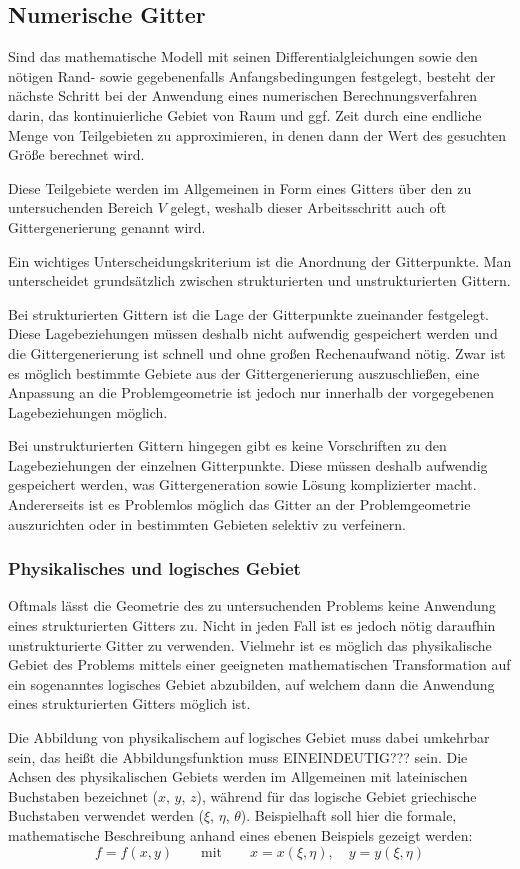\subsection{Numerische Gitter}

Sind das mathematische Modell mit seinen Differentialgleichungen sowie den nötigen
Rand- sowie gegebenenfalls Anfangsbedingungen festgelegt, besteht der nächste Schritt
bei der Anwendung eines numerischen Berechnungsverfahren darin, das kontinuierliche
Gebiet von Raum und ggf. Zeit durch eine endliche Menge von Teilgebieten zu approximieren,
in denen dann der Wert des gesuchten Größe berechnet wird.

Diese Teilgebiete werden im Allgemeinen in Form eines Gitters über den zu untersuchenden
Bereich $V$ gelegt, weshalb dieser Arbeitsschritt auch oft Gittergenerierung genannt wird.

Ein wichtiges Unterscheidungskriterium ist die Anordnung der Gitterpunkte.
Man unterscheidet grundsätzlich zwischen strukturierten und unstrukturierten Gittern.

Bei strukturierten Gittern ist die Lage der Gitterpunkte zueinander festgelegt. Diese
Lagebeziehungen müssen deshalb nicht aufwendig gespeichert werden und die Gittergenerierung
ist schnell und ohne großen Rechenaufwand nötig. Zwar ist es möglich bestimmte Gebiete
aus der Gittergenerierung auszuschließen, eine Anpassung an die Problemgeometrie ist
jedoch nur innerhalb der vorgegebenen Lagebeziehungen möglich.

Bei unstrukturierten Gittern hingegen gibt es keine Vorschriften zu den Lagebeziehungen
der einzelnen Gitterpunkte. Diese müssen deshalb aufwendig gespeichert werden, was
Gittergeneration sowie Lösung komplizierter macht. Andererseits ist es Problemlos möglich
das Gitter an der Problemgeometrie auszurichten oder in bestimmten Gebieten selektiv zu verfeinern.

\subsubsection{Physikalisches und logisches Gebiet}

Oftmals lässt die Geometrie des zu untersuchenden Problems keine Anwendung eines
strukturierten Gitters zu. Nicht in jeden Fall ist es jedoch nötig daraufhin unstrukturierte
Gitter zu verwenden. Vielmehr ist es möglich das physikalische Gebiet des Problems
mittels einer geeigneten mathematischen Transformation auf ein sogenanntes
logisches Gebiet abzubilden, auf welchem dann die Anwendung eines strukturierten Gitters
möglich ist.

Die Abbildung von physikalischem auf logisches Gebiet muss dabei umkehrbar sein, das heißt
die Abbildungsfunktion muss EINEINDEUTIG??? sein. Die Achsen des physikalischen Gebiets
werden im Allgemeinen mit lateinischen Buchstaben bezeichnet ($x$, $y$, $z$), während
für das logische Gebiet griechische Buchstaben verwendet werden ($\xi$, $\eta$, $\theta$).
Beispielhaft soll hier die formale, mathematische Beschreibung anhand eines ebenen
Beispiels gezeigt werden:
\begin{equation}
  f=f(x, y)\qquad \text{mit} \qquad x=x(\xi, \eta),\quad y=y(\xi, \eta)
\end{equation}


